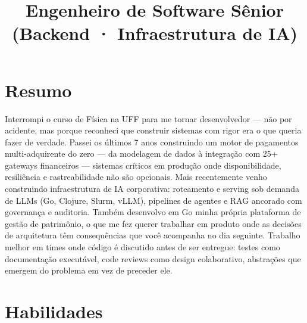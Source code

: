 \documentclass[10pt,a4paper,sans]{moderncv}
\title{Engenheiro de Software Sênior (Backend · Infraestrutura de IA)}
\begin{document}
\makecvtitle

\section{Resumo}
Interrompi o curso de Física na UFF para me tornar desenvolvedor --- não por acidente, mas porque reconheci que construir sistemas com rigor era o que queria fazer de verdade. Passei os últimos 7 anos construindo um motor de pagamentos multi-adquirente do zero --- da modelagem de dados à integração com 25+ gateways financeiros --- sistemas críticos em produção onde disponibilidade, resiliência e rastreabilidade não são opcionais. Mais recentemente venho construindo infraestrutura de IA corporativa: roteamento e serving sob demanda de LLMs (Go, Clojure, Slurm, vLLM), pipelines de agentes e RAG ancorado com governança e auditoria. Também desenvolvo em Go minha própria plataforma de gestão de patrimônio, o que me fez querer trabalhar em produto onde as decisões de arquitetura têm consequências que você acompanha no dia seguinte. Trabalho melhor em times onde código é discutido antes de ser entregue: testes como documentação executável, code reviews como design colaborativo, abstrações que emergem do problema em vez de preceder ele.

\section{Habilidades}
\end{document}
